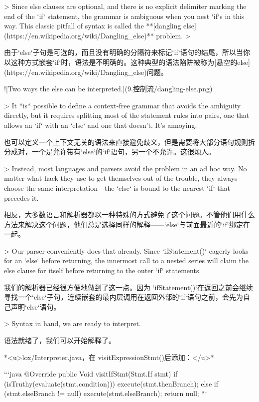 \documentclass[cn,11pt,chinese]{elegantbook}
\begin{document}
{{> Since else clauses are optional, and there is no explicit delimiter marking the end of the `if` statement, the grammar is ambiguous when you nest `if`s in this way. This classic pitfall of syntax is called the **[dangling else](https://en.wikipedia.org/wiki/Dangling_else)** problem.
>

由于`else`子句是可选的，而且没有明确的分隔符来标记`if`语句的结尾，所以当你以这种方式嵌套`if`时，语法是不明确的。这种典型的语法陷阱被称为[悬空的else](https://en.wikipedia.org/wiki/Dangling_else)问题。

![Two ways the else can be interpreted.](9.控制流/dangling-else.png)

> It *is* possible to define a context-free grammar that avoids the ambiguity directly, but it requires splitting most of the statement rules into pairs, one that allows an `if` with an `else` and one that doesn’t. It’s annoying.

也可以定义一个上下文无关的语法来直接避免歧义，但是需要将大部分语句规则拆分成对，一个是允许带有`else`的`if`语句，另一个不允许。这很烦人。

> Instead, most languages and parsers avoid the problem in an ad hoc way. No matter what hack they use to get themselves out of the trouble, they always choose the same interpretation—the `else` is bound to the nearest `if` that precedes it.

相反，大多数语言和解析器都以一种特殊的方式避免了这个问题。不管他们用什么方法来解决这个问题，他们总是选择同样的解释——`else`与前面最近的`if`绑定在一起。

> Our parser conveniently does that already. Since `ifStatement()` eagerly looks for an `else` before returning, the innermost call to a nested series will claim the else clause for itself before returning to the outer `if` statements.

我们的解析器已经很方便地做到了这一点。因为 `ifStatement()`在返回之前会继续寻找一个`else`子句，连续嵌套的最内层调用在返回外部的`if`语句之前，会先为自己声明`else`语句。

> Syntax in hand, we are ready to interpret.

语法就绪了，我们可以开始解释了。

*<u>lox/Interpreter.java，在 visitExpressionStmt()后添加：</u>*

```java
  @Override
  public Void visitIfStmt(Stmt.If stmt) {
    if (isTruthy(evaluate(stmt.condition))) {
      execute(stmt.thenBranch);
    } else if (stmt.elseBranch != null) {
      execute(stmt.elseBranch);
    }
    return null;
  }
```

}}
\end{document}
